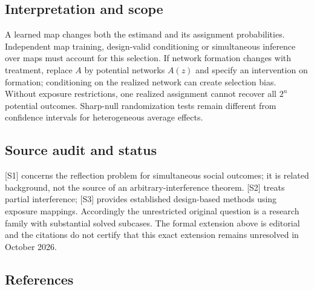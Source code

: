 \documentclass[11pt,a4paper]{article}
\begin{document}
\subsection*{Interpretation and scope}

A learned map changes both the estimand and its assignment probabilities. Independent map training, design-valid conditioning or simultaneous inference over maps must account for this selection. If network formation changes with treatment, replace $A$ by potential networks $A(z)$ and specify an intervention on formation; conditioning on the realized network can create selection bias. Without exposure restrictions, one realized assignment cannot recover all $2^n$ potential outcomes. Sharp-null randomization tests remain different from confidence intervals for heterogeneous average effects.

\subsection*{Source audit and status}

[S1] concerns the reflection problem for simultaneous social outcomes; it is related background, not the source of an arbitrary-interference theorem. [S2] treats partial interference; [S3] provides established design-based methods using exposure mappings. Accordingly the unrestricted original question is a research family with substantial solved subcases. The formal extension above is editorial and the citations do not certify that this exact extension remains unresolved in October 2026.

\subsection*{References}
\end{document}
